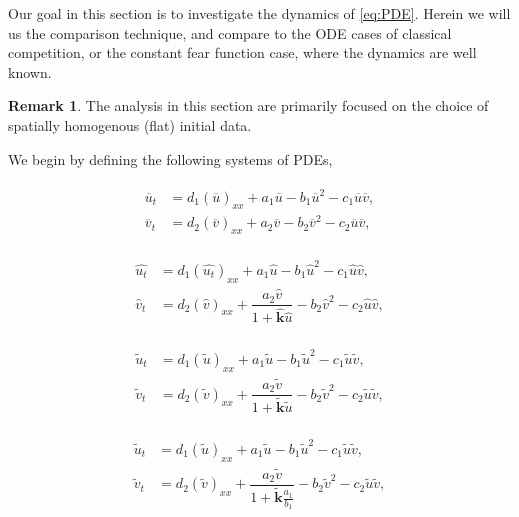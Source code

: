 \documentclass[10pt]{amsart}
\theoremstyle{definition}
\newtheorem{remark}{Remark}
\begin{document}
Our goal in this section is to investigate the dynamics of \eqref{eq:PDE}. Herein we will us the comparison technique, and compare to the ODE cases of classical competition, or the constant fear function case, where the dynamics are well known. 

\begin{remark}
	The analysis in this section are primarily focused on the choice of spatially homogenous (flat) initial data.
\end{remark}

We begin by defining the following systems of PDEs,

\begin{align}\label{eq:lv_model}
	\begin{split}
		\overline{u}_t &= d_1 (\overline{u})_{xx} + a_1 \overline{u} -b_1 \overline{u}^2 -c_1 \overline{u}\overline{v}, \\
		\overline{v}_t &=  d_2 (\overline{v})_{xx} +a_2 \overline{v}  -b_2 \overline{v}^2 -c_2 \overline{u}\overline{v},
	\end{split}
\end{align}

\begin{align}\label{eq:upper}
	\begin{split}
		\widehat{u_t} &= d_1 (\widehat{u_t})_{xx} + a_1 \widehat{u} -b_1 \widehat{u}^2 -c_1 \widehat{u}\widehat{v}, \\
		\widehat{v}_t &=  d_2 (\widehat{v})_{xx} +\dfrac{a_2 \widehat{v}}{1+\mathbf{\widehat{k}} \widehat{u}}  -b_2 \widehat{v}^2 -c_2 \widehat{u}\widehat{v},
	\end{split}
\end{align}

\begin{align}\label{eq:lower}
	\begin{split}
		\widetilde{u} _t &= d_1 ( \widetilde{u})_{xx} + a_1  \widetilde{u} -b_1  \widetilde{u}^2 -c_1  \widetilde{u}\widetilde{v},\\
		\widetilde{v}_t &=  d_2 (\widetilde{v})_{xx} +\dfrac{a_2  \widetilde{v}}{1+\mathbf{\widetilde{k}} \widetilde{u}}  -b_2 \widetilde{v}^2 -c_2  \widetilde{u}\widetilde{v},
	\end{split}
\end{align}

\begin{align}\label{eq:lowest}
	\begin{split}
		\tilde{u} _t &= d_1 ( \tilde{u})_{xx} + a_1  \tilde{u} -b_1  \tilde{u}^2 -c_1  \tilde{u}\widetilde{v},\\
		\tilde{v}_t &=  d_2 (\tilde{v})_{xx} +\dfrac{a_2  \tilde{v}}{1+\mathbf{\tilde{k}} \frac{a_{1}}{b_{1}}}  -b_2 \tilde{v}^2 -c_2  \tilde{u}\tilde{v},
	\end{split}
\end{align}
\end{document}
